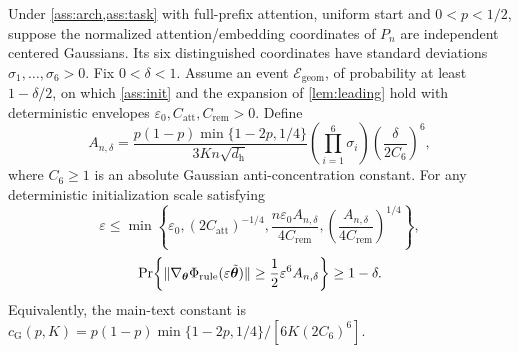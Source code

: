 \begin{proposition}
\label{lem:quant-rule-gradient}
Under \cref{ass:arch,ass:task} with full-prefix attention, uniform start and
$0<p<1/2$, suppose the normalized attention/embedding coordinates of $P_n$
are independent centered Gaussians. Its six distinguished coordinates have
standard deviations $\sigma_1,\ldots,\sigma_6>0$. Fix $0<\delta<1$.
Assume an event $\mathcal E_{\mathrm{geom}}$, of probability at least
$1-\delta/2$, on which \cref{ass:init} and the expansion of
\cref{lem:leading} hold with deterministic envelopes
$\varepsilon_0,C_{\mathrm{att}},C_{\mathrm{rem}}>0$. Define
\begin{equation}\label{eq:t2-gaussian-threshold}
 A_{n,\delta}=\frac{p(1-p)\min\{1-2p,1/4\}}{3Kn\sqrt{d_{\mathrm h}}}
 \left(\prod_{i=1}^6\sigma_i\right)
 \left(\frac{\delta}{2C_6}\right)^6,
\end{equation}
where $C_6\ge1$ is an absolute Gaussian anti-concentration constant.
For any deterministic initialization scale satisfying
\begin{equation}\label{eq:t2-gaussian-epsilon}
 \varepsilon\le\min\left\{\varepsilon_0,(2C_{\mathrm{att}})^{-1/4},
 \frac{n\varepsilon_0 A_{n,\delta}}{4C_{\mathrm{rem}}},
 \left(\frac{A_{n,\delta}}{4C_{\mathrm{rem}}}\right)^{1/4}\right\},
\end{equation}
\begin{equation}\label{eq:t2-gaussian-credit}
 \Pr\!\left\{\|\nabla_{\bm\theta}\rulecredit
 (\varepsilon\tilde{\bm\theta})\|
 \ge\tfrac12\varepsilon^6 A_{n,\delta}\right\}\ge1-\delta.
\end{equation}
Equivalently, the main-text constant is
$c_{\mathrm G}(p,K)=p(1-p)\min\{1-2p,1/4\}/[6K(2C_6)^6]$.

\end{proposition}
